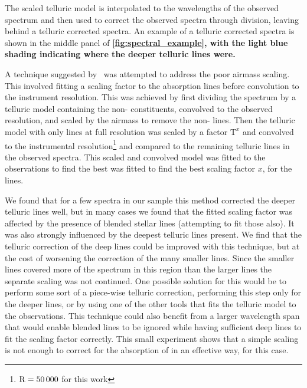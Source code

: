 The scaled telluric model is interpolated to the wavelengths of the observed spectrum and then used to correct the observed spectra through division, leaving behind a telluric corrected spectra.
An example of a telluric corrected spectra is shown in the middle panel of \textbf{\cref{fig:spectral_example}, with the light blue shading indicating where the deeper telluric lines were.
}

A technique suggested by~\citet{bertaux_tapas_2014} was attempted to address the poor  airmass scaling. This involved fitting a scaling factor to the   absorption lines before convolution to the instrument resolution.
This was achieved by first dividing the spectrum by a telluric model containing the non- constituents, convolved to the observed resolution, and scaled by the airmass to remove the non- lines.
Then the telluric model with only  lines at full resolution was scaled by a factor \(\textrm{T}^{x}\) and convolved to the instrumental resolution\footnote{\(\rm R=50\,000\) for this work} and compared to the remaining telluric lines in the observed spectra. This scaled and convolved model was fitted to the observations to find the best was fitted to find the best scaling factor \(x\),  for the  lines.

We found that for a few spectra in our sample this method corrected the deeper telluric lines well, but in many cases we found that the fitted scaling factor was affected by the presence of blended stellar lines (attempting to fit those also).
It was also strongly influenced by the deepest   telluric lines present.
We find that the telluric correction of the deep  lines could be improved with this technique, but at the cost of worsening the correction of the many smaller  lines.
Since the smaller  lines covered more of the spectrum in this region than the larger lines the separate  scaling was not continued.
One possible solution for this would be to perform some sort of a piece-wise telluric correction, performing this step only for the deeper  lines, or by using one of the other tools that fits the telluric model to the observations.
This technique could also benefit from a larger wavelength span that would enable blended lines to be ignored while having sufficient deep  lines to fit the scaling factor correctly.
This small experiment shows that a simple scaling is not enough to correct for the absorption of  in an effective way, for this case.

